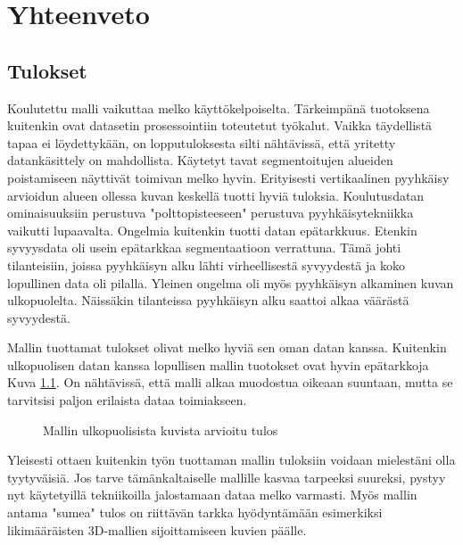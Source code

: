 \chapter{Yhteenveto}%
\label{ch:yhteenveto}

\section{Tulokset}

Koulutettu malli vaikuttaa melko käyttökelpoiselta. Tärkeimpänä tuotoksena kuitenkin ovat datasetin prosessointiin toteutetut työkalut.
Vaikka täydellistä tapaa ei löydettykään, on lopputuloksesta silti nähtävissä, että yritetty datankäsittely on mahdollista.
Käytetyt tavat segmentoitujen alueiden poistamiseen näyttivät toimivan melko hyvin.
Erityisesti vertikaalinen pyyhkäisy arvioidun alueen ollessa kuvan keskellä tuotti hyviä tuloksia.
Koulutusdatan ominaisuuksiin perustuva "polttopisteeseen" perustuva pyyhkäisytekniikka vaikutti lupaavalta.
Ongelmia kuitenkin tuotti datan epätarkkuus.
Etenkin syvyysdata oli usein epätarkkaa segmentaatioon verrattuna.
Tämä johti tilanteisiin, joissa pyyhkäisyn alku lähti virheellisestä syvyydestä ja koko lopullinen data oli pilalla. 
Yleinen ongelma oli myös pyyhkäisyn alkaminen kuvan ulkopuolelta.
Näissäkin tilanteissa pyyhkäisyn alku saattoi alkaa väärästä syvyydestä.

Mallin tuottamat tulokset olivat melko hyviä sen oman datan kanssa.
Kuitenkin ulkopuolisen datan kanssa lopullisen mallin tuotokset ovat hyvin epätarkkoja Kuva \ref{fig:ulkoinen}.
On nähtävissä, että malli alkaa muodostua oikeaan suuntaan, mutta se tarvitsisi paljon erilaista dataa toimiakseen.

\begin{figure}[h]
\centering
{}
\caption{Mallin ulkopuolisista kuvista arvioitu tulos}
\label{fig:ulkoinen}
\end{figure}

Yleisesti ottaen kuitenkin työn tuottaman mallin tuloksiin voidaan mielestäni olla tyytyväisiä.
Jos tarve tämänkaltaiselle mallille kasvaa tarpeeksi suureksi, pystyy nyt käytetyillä tekniikoilla jalostamaan dataa melko varmasti.
Myös mallin antama "sumea" tulos on riittävän tarkka hyödyntämään esimerkiksi likimääräisten 3D-mallien sijoittamiseen kuvien päälle.

